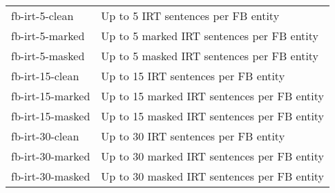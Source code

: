 \begin{tabular}{ l l }
    \addlinespace

    fb-irt-5-clean    & Up to 5 IRT sentences per FB entity            \\
    fb-irt-5-marked   & Up to 5 marked IRT sentences per FB entity     \\
    fb-irt-5-masked   & Up to 5 masked IRT sentences per FB entity     \\

    \addlinespace

    fb-irt-15-clean   & Up to 15 IRT sentences per FB entity           \\
    fb-irt-15-marked  & Up to 15 marked IRT sentences per FB entity    \\
    fb-irt-15-masked  & Up to 15 masked IRT sentences per FB entity    \\

    \addlinespace

    fb-irt-30-clean   & Up to 30 IRT sentences per FB entity           \\
    fb-irt-30-marked  & Up to 30 marked IRT sentences per FB entity    \\
    fb-irt-30-masked  & Up to 30 masked IRT sentences per FB entity    \\

    \bottomrule
\end{tabular}
